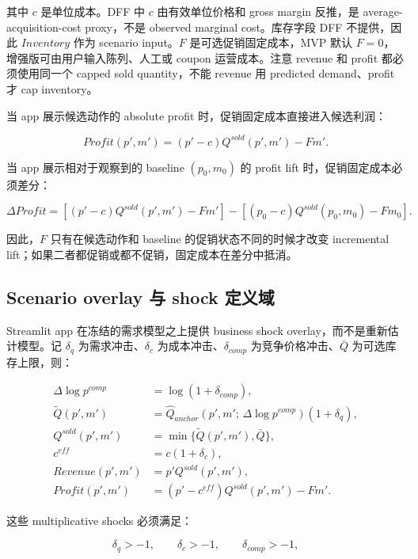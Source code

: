 \documentclass[UTF8,11pt,a4paper,fontset=none]{ctexart}
\begin{document}
其中 $c$ 是单位成本。DFF 中 $c$ 由有效单位价格和 gross margin 反推，是 average-acquisition-cost proxy，不是 observed marginal cost。库存字段 DFF 不提供，因此 $Inventory$ 作为 scenario input。$F$ 是可选促销固定成本，MVP 默认 $F=0$，增强版可由用户输入陈列、人工或 coupon 运营成本。注意 revenue 和 profit 都必须使用同一个 capped sold quantity，不能 revenue 用 predicted demand、profit 才 cap inventory。

当 app 展示候选动作的 absolute profit 时，促销固定成本直接进入候选利润：

\begin{equation}
Profit(p',m')=(p'-c)Q^{sold}(p',m')-Fm'.
\end{equation}

当 app 展示相对于观察到的 baseline $(p_0,m_0)$ 的 profit lift 时，促销固定成本必须差分：

\begin{equation}
\Delta Profit =
\left[(p'-c)Q^{sold}(p',m')-Fm'\right]
-
\left[(p_0-c)Q^{sold}(p_0,m_0)-Fm_0\right].
\end{equation}

因此，$F$ 只有在候选动作和 baseline 的促销状态不同的时候才改变 incremental lift；如果二者都促销或都不促销，固定成本在差分中抵消。

\subsection{Scenario overlay 与 shock 定义域}

Streamlit app 在冻结的需求模型之上提供 business shock overlay，而不是重新估计模型。记 $\delta_q$ 为需求冲击、$\delta_c$ 为成本冲击、$\delta_{comp}$ 为竞争价格冲击、$\bar{Q}$ 为可选库存上限，则：

\begin{align}
\Delta\log p^{comp} &= \log(1+\delta_{comp}),\\
\widetilde{Q}(p',m') &= \widehat{Q}_{anchor}\!\left(p',m';\,\Delta\log p^{comp}\right)(1+\delta_q),\\
Q^{sold}(p',m') &= \min\{\widetilde{Q}(p',m'),\bar{Q}\},\\
c^{eff} &= c(1+\delta_c),\\
Revenue(p',m') &= p'Q^{sold}(p',m'),\\
Profit(p',m') &= (p'-c^{eff})Q^{sold}(p',m')-Fm'.
\end{align}

这些 multiplicative shocks 必须满足：

\begin{equation}
\delta_q>-1,\qquad \delta_c>-1,\qquad \delta_{comp}>-1,
\end{equation}
\end{document}
